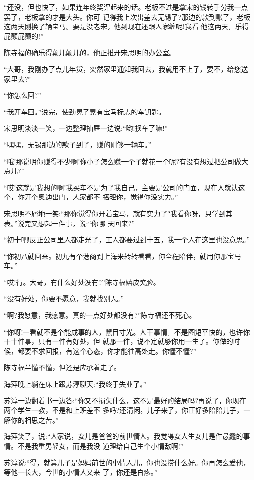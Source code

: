 \documentclass[11pt,a4paper,onecolumn]{article}
\begin{document}
``还没，但也快了，如果连年终奖评起来的话。老板不过是拿宋的钱转手分我一点罢了，老板拿的才是大头。你可
记得我上次出差去无锡了?那边的款到账了，老板这两天刚换了辆宝马。要是没老宋，他到现在还跟人家缠呢!我看
他这两天，乐得屁颠屁颠的!''

陈寺福的确乐得颠儿颠儿的，他正推开宋思明的办公室。

``大哥，我刚办了点儿年货，突然家里通知我回去，我就用不上了，要不，给您送家里去?''

``你怎么回?''

``我开车回。''说完，使劲晃了晃有宝马标志的车钥匙。

宋思明淡淡一笑，一边整理抽屉一边说:``哟!换车了嘛!''

``嘿嘿，无锡那边的款子到了，赚的刚够一辆车。''

``哦!那说明你赚得不少啊!你小子怎么赚一个子就花一个呢?有没有想过把公司做大点儿?''

``哎!这就是我想的啊!我买车不是为了我自己，主要是公司的门面，现在人就认这个，你开个奥迪出门，人家都不
搭理你，觉得你没实力。''

宋思明不屑地一笑:``那你觉得你开着宝马，就有实力了?我看你呀，只学到其表。''说完又想起一件事，说:``你哪
天回来?''

``初十吧!反正公司里人都走光了，工人都要过到十五，我一个人在这里也没意思。''

``你初八就回来。初九有个港商到上海来转转看看，你全程陪伴，就用你那宝马车。''

``哎!行。大哥，有什么好处没有?''陈寺福嬉皮笑脸。

``没有好处，你要不愿意，我就找别人。''

``啊?我愿意，我愿意。真的一点好处都没有?''陈寺福还不死心。

``你呀!一看就不是个能成事的人，鼠目寸光。人干事情，不是图短平快的，也许你干十件事，只有一件有好处，但
就那一件，说不定就够你用一生了。你做的时候，都要不求回报，有这个心态，你才能往高处走。你懂不懂?''

陈寺福半懂不懂，但还是应承着走了。

海萍晚上躺在床上跟苏淳聊天:``我终于失业了。''

苏淳一边翻着书一边答:``你又不损失什么，这不是最好的结局吗?再说了，你现在两个学生一教，不是和上班差不
多吗?还清闲。儿子来了，你正好多陪陪儿子，一解你的相思之苦。''

海萍笑了，说:``人家说，女儿是爸爸的前世情人。我觉得女人生女儿是件愚蠢的事情。不是我重男轻女，而是我没
道理给自己生个小情敌啊!''

苏淳说:``得，就算儿子是妈妈前世的小情人儿，你也没捞什么好。你再怎么爱他，等他一长大，今世的小情人又来
了，你还是白疼。''
\end{document}
